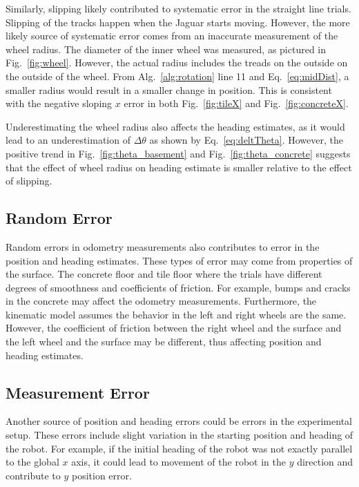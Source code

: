 \documentclass[conference]{../IEEEtran}
\begin{document}
Similarly, slipping likely contributed to systematic error in the straight line trials.
Slipping of the tracks happen when the Jaguar starts moving. However, the more likely
source of systematic error comes from an inaccurate measurement of the wheel radius. The
diameter of the inner wheel was measured, as pictured in Fig.~\ref{fig:wheel}. However,
the actual radius includes the treads on the outside on the outside of the wheel. From
Alg.~\ref{alg:rotation} line 11 and Eq.~\ref{eq:midDist}, a smaller radius would result in
a smaller change in position. This is consistent with the negative sloping $x$ error in
both Fig.~\ref{fig:tileX} and Fig.~\ref{fig:concreteX}.

Underestimating the wheel radius also affects the heading estimates, as it would lead to
an underestimation of $\Delta \theta$ as shown by Eq.~\ref{eq:deltTheta}.  However, the
positive trend in Fig.~\ref{fig:theta_basement} and Fig.~\ref{fig:theta_concrete} suggests
that the effect of wheel radius on heading estimate is smaller relative to the effect of
slipping.

\subsection{Random Error}

Random errors in odometry measurements also contributes to error in the position and
heading estimates. These types of error may come from properties of the surface. The
concrete floor and tile floor where the trials have different degrees of smoothness and
coefficients of friction. For example, bumps and cracks in the concrete may affect the
odometry measurements. Furthermore, the kinematic model assumes the behavior in the left
and right wheels are the same. However, the coefficient of friction between the right
wheel and the surface and the left wheel and the surface may be different, thus affecting
position and heading estimates.

\addtolength{\textheight}{-14.5cm}

\subsection{Measurement Error}

Another source of position and heading errors could be errors in the
experimental setup. These errors include slight variation in the starting
position and heading of the robot. For example, if the initial heading of
the robot was not exactly parallel to the global $x$ axis, it could lead
to movement of the robot in the $y$ direction and contribute to $y$ position
error.
\end{document}
